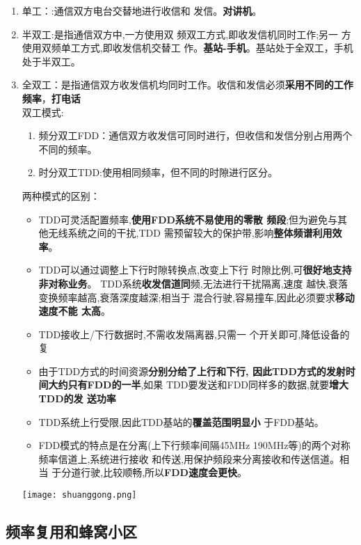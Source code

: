 	\begin{enumerate}
		\item 单工：:通信双方电台交替地进行收信和
		发信。\textbf{对讲机}。
		\item 半双工:是指通信双方中,一方使用双 
		频双工方式,即收发信机同时工作;另一
		方使用双频单工方式,即收发信机交替工
		作。\textbf{基站-手机}。基站处于全双工，手机处于半双工。
		\item 全双工：是指通信双方收发信机均同时工作。收信和发信必须\textbf{采用不同的工作频率}，\textbf{打电话}	\\
		双工模式:
		\begin{enumerate}
		\item 频分双工FDD：通信双方收发信可同时进行，但收信和发信分别占用两个不同的频率。
		\item 时分双工TDD:使用相同频率，但不同的时隙进行区分。
		\end{enumerate}
		两种模式的区别：
		
		\begin{itemize}
			\item TDD可灵活配置频率,\textbf{使用FDD系统不易使用的零散
			频段};但为避免与其他无线系统之间的干扰,TDD
			需预留较大的保护带,影响\textbf{整体频谱利用效率}。
			\item TDD可以通过调整上下行时隙转换点,改变上下行
			时隙比例,可\textbf{很好地支持非对称业务}。
			TDD系统\textbf{收发信道同}频,无法进行干扰隔离,速度
			越快,衰落变换频率越高,衰落深度越深;相当于
			混合行驶,容易撞车,因此必须要求\textbf{移动速度不能
			太高}。
			\item TDD接收上/下行数据时,不需收发隔离器,只需一
			个开关即可,降低设备的复
			\item 由于TDD方式的时间资源\textbf{分别分给了上行和下行,
			因此TDD方式的发射时间大约只有FDD的一半},如果
			TDD要发送和FDD同样多的数据,就要\textbf{增大TDD的发
			送功率}
			\item TDD系统上行受限,因此TDD基站的\textbf{覆盖范围明显小}
			于FDD基站。
			\item FDD模式的特点是在分离(上下行频率间隔45MHz
			190MHz等)的两个对称频率信道上,系统进行接收
			和传送,用保护频段来分离接收和传送信道。相当
			于分道行驶,比较顺畅,所以\textbf{FDD速度会更快}。
		\end{itemize}
	
		\begin{center}
			\texttt{[image: shuanggong.png]}
		\end{center}
	\end{enumerate}
	\subsection{频率复用和蜂窝小区}
